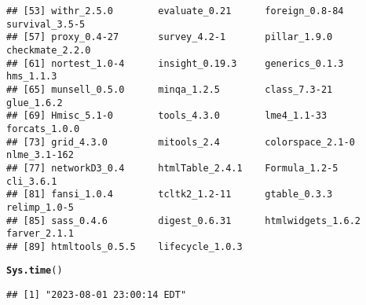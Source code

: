 \documentclass{article}\usepackage[]{graphicx}\usepackage[]{xcolor}
\makeatletter
\newcommand{\hlstd}[1]{\textcolor[rgb]{0.345,0.345,0.345}{#1}}%
\newcommand{\hlkwd}[1]{\textcolor[rgb]{0.737,0.353,0.396}{\textbf{#1}}}%
\newenvironment{kframe}{%
 \def\at@end@of@kframe{}%
 \ifinner\ifhmode%
  \def\at@end@of@kframe{\end{minipage}}%
  \begin{minipage}{\columnwidth}%
 \fi\fi%
 \def\FrameCommand##1{\hskip\@totalleftmargin \hskip-\fboxsep
 \colorbox{shadecolor}{##1}\hskip-\fboxsep
     \hskip-\linewidth \hskip-\@totalleftmargin \hskip\columnwidth}%
 \MakeFramed {\advance\hsize-\width
   \@totalleftmargin\z@ \linewidth\hsize
   \@setminipage}}%
 {\par\unskip\endMakeFramed%
 \at@end@of@kframe}
\newenvironment{knitrout}{}{} %
\makeatother
\begin{document}
\begin{knitrout}
\begin{kframe}
\begin{verbatim}
## [53] withr_2.5.0        evaluate_0.21      foreign_0.8-84     survival_3.5-5    
## [57] proxy_0.4-27       survey_4.2-1       pillar_1.9.0       checkmate_2.2.0   
## [61] nortest_1.0-4      insight_0.19.3     generics_0.1.3     hms_1.1.3         
## [65] munsell_0.5.0      minqa_1.2.5        class_7.3-21       glue_1.6.2        
## [69] Hmisc_5.1-0        tools_4.3.0        lme4_1.1-33        forcats_1.0.0     
## [73] grid_4.3.0         mitools_2.4        colorspace_2.1-0   nlme_3.1-162      
## [77] networkD3_0.4      htmlTable_2.4.1    Formula_1.2-5      cli_3.6.1         
## [81] fansi_1.0.4        tcltk2_1.2-11      gtable_0.3.3       relimp_1.0-5      
## [85] sass_0.4.6         digest_0.6.31      htmlwidgets_1.6.2  farver_2.1.1      
## [89] htmltools_0.5.5    lifecycle_1.0.3
\end{verbatim}
\begin{alltt}
\hlkwd{Sys.time}\hlstd{()}
\end{alltt}
\begin{verbatim}
## [1] "2023-08-01 23:00:14 EDT"
\end{verbatim}
\end{kframe}
\end{knitrout}
\end{document}
